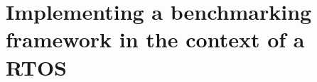 \documentclass{EPL-master-thesis-covers-EN}
\begin{document}
\part{Implementing a benchmarking framework in the context of a RTOS}











\cleardoublepage
{}
\listoffigures
\listoftables

\printbibliography

\backcoverpage
\end{document}

